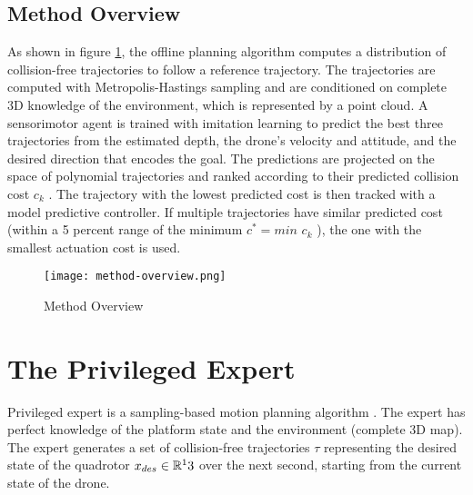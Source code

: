\subsection{Method Overview}
As shown in figure \ref{fig:method-overview}, the offline planning algorithm computes a distribution of collision-free trajectories to follow a reference trajectory. The trajectories are computed with Metropolis-Hastings \cite{MH_hasting} sampling and are conditioned on complete 3D knowledge of the environment, which is represented by a point cloud. A sensorimotor agent is trained with imitation learning to predict the best three trajectories from the estimated depth, the drone’s velocity and attitude, and the desired direction that encodes the goal. The predictions are projected on the
space of polynomial trajectories and ranked according to their predicted collision cost $c_k$ . The trajectory with the lowest predicted cost is then
tracked with a model predictive controller. If multiple trajectories have similar predicted cost (within a 5 percent range of the minimum $c^* = min$ $c_k$ ),
the one with the smallest actuation cost is used.

\begin{figure}[!h]
	\centering
	\texttt{[image: method-overview.png]}
	\caption{Method Overview}
	\label{fig:method-overview}
	
\end{figure}

\section{The Privileged Expert}
Privileged expert is a sampling-based motion planning algorithm \cite{MH_hasting}.
The expert has perfect knowledge of the platform state and the environment (complete 3D map). The expert generates a set of collision-free trajectories $\tau$ representing the desired state of the quadrotor $x_{des} \in \mathbb{R}^13$ over the
next second, starting from the current state of the drone.

